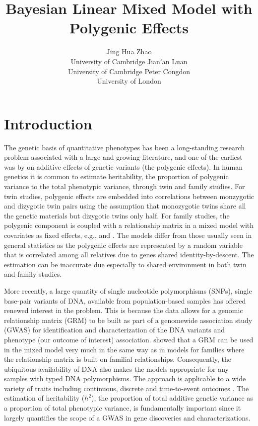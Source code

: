 \documentclass[article]{jss}
\author{Jing Hua Zhao\\University of Cambridge
 \And Jian'an Luan\\University of Cambridge
 \And Peter Congdon\\University of London}
\title{Bayesian Linear Mixed Model with Polygenic Effects}
\begin{document}
\section{Introduction}

The genetic basis of quantitative phenotypes has been a long-standing
research problem associated with a large and growing literature, and
one of the earliest was by \cite{fisher18} on additive effects of
genetic variants (the polygenic effects). In human genetics it is
common to estimate heritability, the proportion of polygenic variance
to the total phenotypic variance, through twin and family studies. For
twin studies, polygenic effects are embedded into correlations between
monzygotic and dizygotic twin pairs using the assumption that
monozygotic twins share all the genetic materials but dizygotic twins
only half. For family studies, the polygenic component is coupled with
a relationship matrix in a mixed model with covariates as fixed
effects, e.g., \cite{morton74} and \cite{lange02}.  The models differ
from those usually seen in general statistics as the polygenic effects
are represented by a random variable that is correlated among all
relatives due to genes shared identity-by-descent. The estimation can
be inaccurate due especially to shared environment in both twin and
family studies.

More recently, a large quantity of single nucleotide polymorphisms (SNPs), 
single base-pair variants of DNA, available from population-based samples 
has offered renewed interest in the problem. This is because the data 
allows for a genomic relationship matrix (GRM) to be built as part of a 
genomewide association study (GWAS) for identification and 
characterization of the DNA variants and phenotype (our outcome of 
interest) association. \cite{yang10} showed that a GRM can be used in the 
mixed model very much in the same way as in models for families where the 
relationship matrix is built on familial relationships. Consequently, the
ubiquitous availability of DNA also makes the models appropriate for any
samples with typed DNA polymorphisms. The approach is 
applicable to a wide variety of traits including continuous, discrete and 
time-to-event outcomes \citep{zhao12}. The estimation of heritability 
($h^2$), the proportion of total additive genetic variance as a proportion 
of total phenotypic variance, is fundamentally important since it largely 
quantifies the scope of a GWAS in gene discoveries and characterizations.
\end{document}
